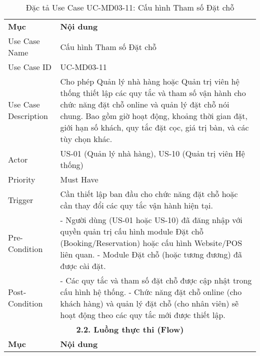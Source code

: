 \begin{longtable}{|m{4cm}|p{11cm}|}
\caption{Đặc tả Use Case UC-MD03-11: Cấu hình Tham số Đặt chỗ} \label{tab:uc_md03_11} \\
\hline

\endhead %
\hline
\endfoot %
\hline
\endlastfoot %
\multicolumn{2}{|c|}{\textbf{2.1. Tóm tắt (Summary)}} \\
\hline
\textbf{Mục} & \textbf{Nội dung} \\
\hline
Use Case Name & Cấu hình Tham số Đặt chỗ \\
\hline
Use Case ID & UC-MD03-11 \\
\hline
Use Case Description & Cho phép Quản lý nhà hàng hoặc Quản trị viên hệ thống thiết lập các quy tắc và tham số vận hành cho chức năng đặt chỗ online và quản lý đặt chỗ nói chung. Bao gồm giờ hoạt động, khoảng thời gian đặt, giới hạn số khách, quy tắc đặt cọc, giá trị bàn, và các tùy chọn khác. \\
\hline
Actor & US-01 (Quản lý nhà hàng), US-10 (Quản trị viên Hệ thống) \\
\hline
Priority & Must Have \\
\hline
Trigger & Cần thiết lập ban đầu cho chức năng đặt chỗ hoặc cần thay đổi các quy tắc vận hành hiện tại. \\
\hline
Pre-Condition & - Người dùng (US-01 hoặc US-10) đã đăng nhập với quyền quản trị cấu hình module Đặt chỗ (Booking/Reservation) hoặc cấu hình Website/POS liên quan. \newline - Module Đặt chỗ (hoặc tương đương) đã được cài đặt. \\
\hline
Post-Condition & - Các quy tắc và tham số đặt chỗ được cập nhật trong cấu hình hệ thống. \newline - Chức năng đặt chỗ online (cho khách hàng) và quản lý đặt chỗ (cho nhân viên) sẽ hoạt động theo các quy tắc mới được thiết lập. \\
\hline
\multicolumn{2}{|c|}{\textbf{2.2. Luồng thực thi (Flow)}} \\
\hline
\textbf{Mục} & \textbf{Nội dung} \\
\hline

\end{longtable}

